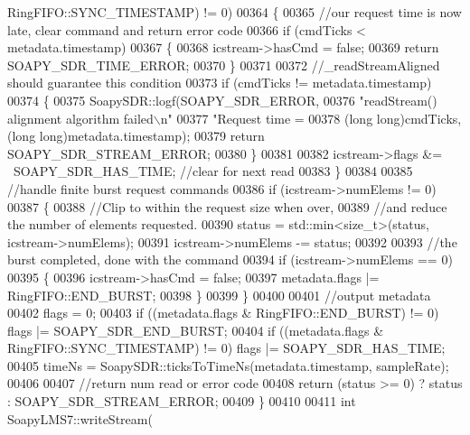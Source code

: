 \begin{DoxyCode}
      RingFIFO::SYNC_TIMESTAMP) != 0)
00364     \{
00365         \textcolor{comment}{//our request time is now late, clear command and return error code}
00366         \textcolor{keywordflow}{if} (cmdTicks < metadata.timestamp)
00367         \{
00368             icstream->hasCmd = \textcolor{keyword}{false};
00369             \textcolor{keywordflow}{return} SOAPY\_SDR\_TIME\_ERROR;
00370         \}
00371 
00372         \textcolor{comment}{//\_readStreamAligned should guarantee this condition}
00373         \textcolor{keywordflow}{if} (cmdTicks != metadata.timestamp)
00374         \{
00375             SoapySDR::logf(SOAPY\_SDR\_ERROR,
00376                 \textcolor{stringliteral}{"readStream() alignment algorithm failed\(\backslash\)n"}
00377                 \textcolor{stringliteral}{"Request time = %
00378                 (\textcolor{keywordtype}{long} \textcolor{keywordtype}{long})cmdTicks, (\textcolor{keywordtype}{long} \textcolor{keywordtype}{long})metadata.timestamp);
00379             \textcolor{keywordflow}{return} SOAPY\_SDR\_STREAM\_ERROR;
00380         \}
00381 
00382         icstream->flags &= ~SOAPY\_SDR\_HAS\_TIME; \textcolor{comment}{//clear for next read}
00383     \}
00384 
00385     \textcolor{comment}{//handle finite burst request commands}
00386     \textcolor{keywordflow}{if} (icstream->numElems != 0)
00387     \{
00388         \textcolor{comment}{//Clip to within the request size when over,}
00389         \textcolor{comment}{//and reduce the number of elements requested.}
00390         status = std::min<size\_t>(status, icstream->numElems);
00391         icstream->numElems -= status;
00392 
00393         \textcolor{comment}{//the burst completed, done with the command}
00394         \textcolor{keywordflow}{if} (icstream->numElems == 0)
00395         \{
00396             icstream->hasCmd = \textcolor{keyword}{false};
00397             metadata.flags |= RingFIFO::END_BURST;
00398         \}
00399     \}
00400 
00401     \textcolor{comment}{//output metadata}
00402     flags = 0;
00403     \textcolor{keywordflow}{if} ((metadata.flags & RingFIFO::END_BURST) != 0) flags |= SOAPY\_SDR\_END\_BURST;
00404     \textcolor{keywordflow}{if} ((metadata.flags & RingFIFO::SYNC_TIMESTAMP) != 0) flags |= SOAPY\_SDR\_HAS\_TIME;
00405     timeNs = SoapySDR::ticksToTimeNs(metadata.timestamp, sampleRate);
00406 
00407     \textcolor{comment}{//return num read or error code}
00408     \textcolor{keywordflow}{return} (status >= 0) ? status : SOAPY\_SDR\_STREAM\_ERROR;
00409 \}
00410 
00411 \textcolor{keywordtype}{int} SoapyLMS7::writeStream(
}
\end{DoxyCode}
